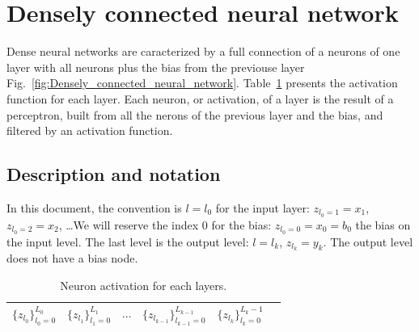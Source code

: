 \documentclass[final, paper=letter,5p,times,twocolumn]{elsarticle}
\begin{document}
 
\section{Densely connected neural network}

Dense neural networks are caracterized by a full connection of a neurons of one layer with all neurons plus the bias from the previouse layer Fig.~\ref{fig:Densely_connected_neural_network}. Table~\ref{Layers_activations} presents the activation function for each layer. Each neuron, or activation, of a layer is the result of a perceptron, built from all the nerons of the previous layer and the bias, and filtered by an activation function. 

\subsection{Description and notation}

In this document, the convention is $l = l_{0}$ for the input layer: $z_{l_{0} = 1} = x_{1}$, $z_{l_{0} = 2} = x_{2}$, \dots We will reserve the index 0 for the bias: $z_{l_{0} = 0} = x_{0} = b_{0}$ the bias on the input level. The last level is the output level: $l = l_{k}$, $z_{l_{k}} = y_{k}$. The output level does not have a bias node.

\begin{table}[]
\centering
\caption{Neuron activation for each layers.}
\label{Layers_activations}
\begin{tabular}{llllll}
  \hline
 $\{ z_{l_{0}}\}_{l_{0} = 0}^{L_{0}}$&  $\{ z_{l_{1}}\}_{l_{1} = 0}^{L_{1}}$ &  $\cdots$ & $\{ z_{l_{k-1}}\}_{l_{k-1} = 0}^{L_{k-1}}$ &  $\{ z_{l_{k}}\}_{l_{k} = 0}^{L_{k}-1}$ &  \\ 
  \hline
\end{tabular}
\end{table}
\end{document}
